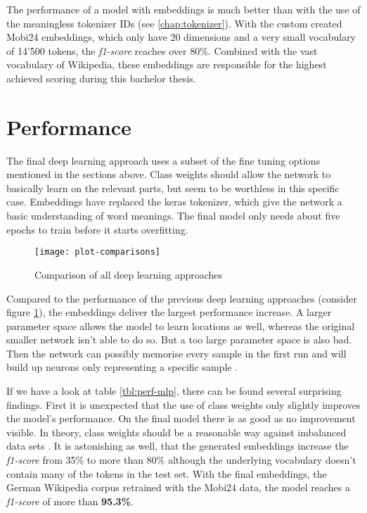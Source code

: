 The performance of a model with embeddings is much better than with the use of the meaningless tokenizer IDs (see \ref{chap:tokenizer}). With the custom created Mobi24 embeddings, which only have 20 dimensions and a very small vocabulary of 14'500 tokens, the \emph{f1-score} reaches over 80\%. Combined with the vast vocabulary of Wikipedia, these embeddings are responsible for the highest achieved scoring during this bachelor thesis.

\section{Performance}
\label{chap:deep-performance}

The final deep learning approach uses a subset of the fine tuning options mentioned in the sections above. Class weights should allow the network to basically learn on the relevant parts, but seem to be worthless in this specific case. Embeddings have replaced the keras tokenizer, which give the network a basic understanding of word meanings. The final model only needs about five epochs to train before it starts overfitting.

\begin{figure}[!ht]
    \centering
    \texttt{[image: plot-comparisons]}
    \caption{Comparison of all deep learning approaches}
    \label{fig:plot-comparisons}
\end{figure}

Compared to the performance of the previous deep learning approaches (consider figure \ref{fig:plot-comparisons}), the embeddings deliver the largest performance increase. A larger parameter space allows the model to learn locations as well, whereas the original smaller network isn't able to do so. But a too large parameter space is also bad. Then the network can possibly memorise every sample in the first run and will build up neurons only representing a specific sample \cite{drop14}.

If we have a look at table \ref{tbl:perf-mlp}, there can be found several surprising findings. First it is unexpected that the use of class weights only slightly improves the model's performance. On the final model there is as good as no improvement visible. In theory, class weights should be a reasonable way against imbalanced data sets \cite{imb18}. It is astonishing as well, that the generated embeddings increase the \emph{f1-score} from 35\% to more than 80\% although the underlying vocabulary doesn't contain many of the tokens in the test set. With the final embeddings, the German Wikipedia corpus retrained with the Mobi24 data, the model reaches a \emph{f1-score} of more than \textbf{95.3\%}.

